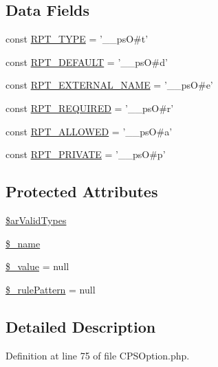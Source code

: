 \subsection*{Data Fields}
\begin{DoxyCompactItemize}
\item 
const \hyperlink{classCPSOption_aa978b1a784800b7a941c6a5871f77e2b}{RPT\_\-TYPE} = '\_\-\_\-psO\#t'
\item 
const \hyperlink{classCPSOption_a269e636bbdcfa28179f931679d48643f}{RPT\_\-DEFAULT} = '\_\-\_\-psO\#d'
\item 
const \hyperlink{classCPSOption_ac03762b40afa4745a976b2fd4b5cba8c}{RPT\_\-EXTERNAL\_\-NAME} = '\_\-\_\-psO\#e'
\item 
const \hyperlink{classCPSOption_a16a4aecf79ed0a222f179f0e44404099}{RPT\_\-REQUIRED} = '\_\-\_\-psO\#r'
\item 
const \hyperlink{classCPSOption_a15957bc41386cbb54751a774d2154721}{RPT\_\-ALLOWED} = '\_\-\_\-psO\#a'
\item 
const \hyperlink{classCPSOption_a1269232ea10c2579723e52653047616c}{RPT\_\-PRIVATE} = '\_\-\_\-psO\#p'
\end{DoxyCompactItemize}
\subsection*{Protected Attributes}
\begin{DoxyCompactItemize}
\item 
\hyperlink{classCPSOption_a5ec047f3082def78aa49930b7b56102b}{\$arValidTypes}
\item 
\hyperlink{classCPSOption_a1c89defaf5aa7ac8e526065e8572f580}{\$\_\-name}
\item 
\hyperlink{classCPSOption_a599c02a4727030b8ecc632f7c8adafeb}{\$\_\-value} = null
\item 
\hyperlink{classCPSOption_aead9fa97d5e656f3765bf21735a19167}{\$\_\-rulePattern} = null
\end{DoxyCompactItemize}


\subsection{Detailed Description}


Definition at line 75 of file CPSOption.php.



